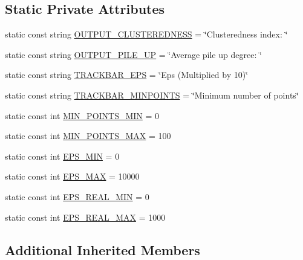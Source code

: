 \subsection*{Static Private Attributes}
\begin{DoxyCompactItemize}
\item 
static const string \hyperlink{classmultiscale_1_1analysis_1_1ClusterDetector_a4fa4c068778bee7160af42020fd25ef0}{O\-U\-T\-P\-U\-T\-\_\-\-C\-L\-U\-S\-T\-E\-R\-E\-D\-N\-E\-S\-S} = \char`\"{}Clusteredness index\-: \char`\"{}
\item 
static const string \hyperlink{classmultiscale_1_1analysis_1_1ClusterDetector_ac695ff11d0e6dd550874cadf507fc11c}{O\-U\-T\-P\-U\-T\-\_\-\-P\-I\-L\-E\-\_\-\-U\-P} = \char`\"{}Average pile up degree\-: \char`\"{}
\item 
static const string \hyperlink{classmultiscale_1_1analysis_1_1ClusterDetector_a656f64f88c73c25824e5a4416a742aaf}{T\-R\-A\-C\-K\-B\-A\-R\-\_\-\-E\-P\-S} = \char`\"{}Eps (Multiplied by 10)\char`\"{}
\item 
static const string \hyperlink{classmultiscale_1_1analysis_1_1ClusterDetector_a7f0fbbf3de8479b106893c4a8161bdaf}{T\-R\-A\-C\-K\-B\-A\-R\-\_\-\-M\-I\-N\-P\-O\-I\-N\-T\-S} = \char`\"{}Minimum number of points\char`\"{}
\item 
static const int \hyperlink{classmultiscale_1_1analysis_1_1ClusterDetector_aa0219df3977a845e46be090e6c3f90ad}{M\-I\-N\-\_\-\-P\-O\-I\-N\-T\-S\-\_\-\-M\-I\-N} = 0
\item 
static const int \hyperlink{classmultiscale_1_1analysis_1_1ClusterDetector_aabb41b5c6e865ee33cbb27568cae5a2d}{M\-I\-N\-\_\-\-P\-O\-I\-N\-T\-S\-\_\-\-M\-A\-X} = 100
\item 
static const int \hyperlink{classmultiscale_1_1analysis_1_1ClusterDetector_a6c3517e03d1fd2c6b4d6cd0d81eb8684}{E\-P\-S\-\_\-\-M\-I\-N} = 0
\item 
static const int \hyperlink{classmultiscale_1_1analysis_1_1ClusterDetector_a76d0b4ecd2793d478317cc1bc856e06f}{E\-P\-S\-\_\-\-M\-A\-X} = 10000
\item 
static const int \hyperlink{classmultiscale_1_1analysis_1_1ClusterDetector_ad9542bde7e3bf36d501a0b203dc61e09}{E\-P\-S\-\_\-\-R\-E\-A\-L\-\_\-\-M\-I\-N} = 0
\item 
static const int \hyperlink{classmultiscale_1_1analysis_1_1ClusterDetector_a3e60b9e068a8addf9dd27382c74e6d62}{E\-P\-S\-\_\-\-R\-E\-A\-L\-\_\-\-M\-A\-X} = 1000
\end{DoxyCompactItemize}
\subsection*{Additional Inherited Members}


